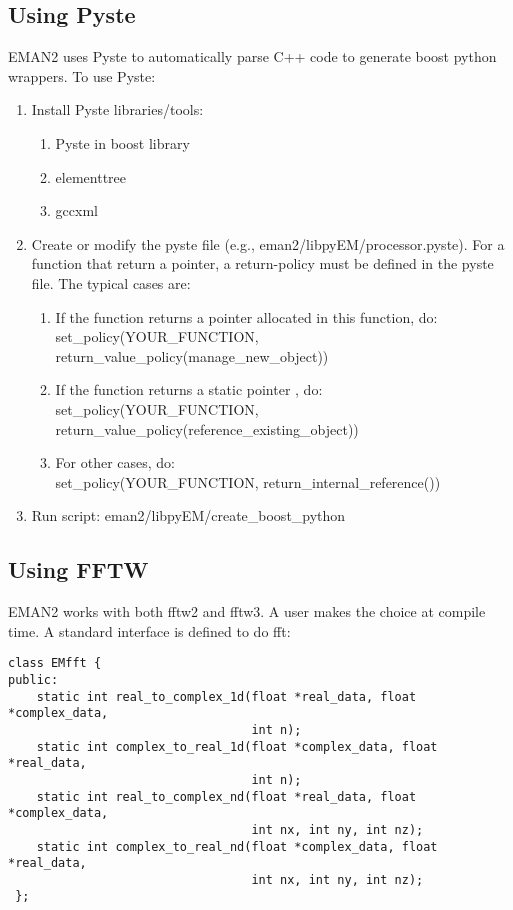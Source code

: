     \subsection{Using Pyste} 
    EMAN2 uses Pyste to automatically parse C++ code to generate boost
    python wrappers. To use Pyste:

    \begin{enumerate}
    \item
      Install Pyste libraries/tools: 
      \begin{enumerate}
      \item
	Pyste in boost library
      \item
	elementtree 
      \item
	gccxml
      \end{enumerate}
    \item
      Create or modify the pyste file (e.g.,
      eman2/libpyEM/processor.pyste). For a function that return a
      pointer, a return-policy must be defined in the pyste
      file. The typical cases are: 
      \begin{enumerate}
      \item If the function returns a pointer allocated in this
	function, do: \\	    
	{\color[named]{Blue} set\_policy(YOUR\_FUNCTION, return\_value\_policy(manage\_new\_object))}
      \item If the function returns a static pointer , do: \\
	{\color[named]{Blue} set\_policy(YOUR\_FUNCTION, return\_value\_policy(reference\_existing\_object))}
      \item For other cases, do: \\
	{\color[named]{Blue}set\_policy(YOUR\_FUNCTION, return\_internal\_reference())}
      \end{enumerate}
    \item
      Run script: eman2/libpyEM/create\_boost\_python
    \end{enumerate}
    
    \subsection{Using FFTW}  

    EMAN2 works with both fftw2 and fftw3. A user makes the choice at
    compile time.  A standard interface is defined to do fft:
    
    {\color[named]{BrickRed}
    \begin{verbatim}class EMfft {
public:
    static int real_to_complex_1d(float *real_data, float *complex_data, 
                                  int n);
    static int complex_to_real_1d(float *complex_data, float *real_data,
                                  int n);
    static int real_to_complex_nd(float *real_data, float *complex_data, 
                                  int nx, int ny, int nz);
    static int complex_to_real_nd(float *complex_data, float *real_data, 
                                  int nx, int ny, int nz);
 };\end{verbatim}
    }
 
